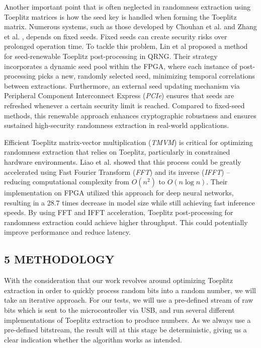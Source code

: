 Another important point that is often neglected in randomness extraction using Toeplitz matrices is how the seed key is handled when forming the Toeplitz matrix. Numerous systems, such as those developed by Chouhan et al. \cite{toeplitz-desc} and Zhang et al. \cite{toeplitz}, depends on fixed seeds. Fixed seeds can create security risks over prolonged operation time. To tackle this problem, Lin et al \cite{lin} proposed a method for seed-renewable Toeplitz post-processing in QRNG. Their strategy incorporates a dynamic seed pool within the FPGA, where each instance of post-processing picks a new, randomly selected seed, minimizing temporal correlations between extractions. Furthermore, an external seed updating mechanism via Peripheral Component Interconnect Express (\emph{PCIe}) ensures that seeds are refreshed whenever a certain security limit is reached. Compared to fixed-seed methods, this renewable approach enhances cryptographic robustness and ensures sustained high-security randomness extraction in real-world applications.

Efficient Toeplitz matrix-vector multiplication (\emph{TMVM}) is critical for optimizing randomness extraction that relies on Toeplitz, particularly in constrained hardware environments. Liao et al. \cite{liao} showed that this process could be greatly accelerated using Fast Fourier Transform (\emph{FFT}) and its inverse (\emph{IFFT}) -- reducing computational complexity from \(O(n^2)\) to \(O(n \log n)\). Their implementation on FPGA utilized this approach for deep neural networks, resulting in a 28.7 times decrease in model size while still achieving fast inference speeds. By using FFT and IFFT acceleration, Toeplitz post-processing for randomness extraction could achieve higher throughput. This could potentially improve performance and reduce latency.

\subsection{5 METHODOLOGY}\label{methodology}

With the consideration that our work revolves around optimizing Toeplitz extraction in order to quickly process random bits into a random number, we will take an iterative approach. For our tests, we will use a pre-defined stream of raw bits which is sent to the microcontroller via USB, and run several different implementations of Toeplitz extraction to produce numbers. As we always use a pre-defined bitstream, the result will at this stage be deterministic, giving us a clear indication whether the algorithm works as intended.

